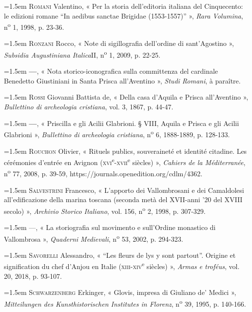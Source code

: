 \documentclass[12pt,twoside,openany]{book}
\newenvironment{PurhBibliography}
  {%
    \par
    \setlength{\parindent}{0pt}%
    \setlength{\leftskip}{0pt}%
  }
  {%
    \par
  }
\begin{document}
\begin{PurhBibliography}
\noindent\hangindent=1.5em \textsc{Romani} Valentino, « Per la storia dell’editoria italiana del Cinquecento: le edizioni romane “In aedibus sanctae Brigidae (1553-1557)” », \textit{Rara Volumina}, n\textsuperscript{o} 1, 1998, p. 23-36.\par
\noindent\hangindent=1.5em \textsc{Ronzani} Rocco, « Note di sigillografia dell’ordine di sant’Agostino », \textit{Subsidia Augustiniana Italica}\textsc{II}, n\textsuperscript{o} 1, 2009, p. 22-25.\par
\noindent\hangindent=1.5em \textbf{—}, « Nota storico-iconografica sulla committenza del cardinale Benedetto Giustiniani in Santa Prisca all’Aventino », \textit{Studi Romani}, à paraître.\par
\noindent\hangindent=1.5em \textsc{Rossi} Giovanni Battista de, « Della casa d’Aquila e Prisca all’Aventino », \textit{Bullettino di archeologia cristiana}, vol. 3, 1867, p. 44-47.\par
\noindent\hangindent=1.5em \textbf{—}, « Priscilla e gli Acilii Glabrioni. § \textsc{VIII}, Aquila e Prisca e gli Acilii Glabrioni », \textit{Bullettino di archeologia cristiana}, n\textsuperscript{o} 6, 1888-1889, p. 128-133.\par
\noindent\hangindent=1.5em \textsc{Rouchon} Olivier, « Rituels publics, souveraineté et identité citadine. Les cérémonies d’entrée en Avignon (\textsc{xvi}\textsuperscript{e}-\textsc{xvii}\textsuperscript{e} siècles) », \textit{Cahiers de la Méditerranée}, n\textsuperscript{o} 77, 2008, p. 39-59, https://journals.openedition.org/cdlm/4362.\par
\noindent\hangindent=1.5em \textsc{Salvestrini} Francesco, « L’apporto dei Vallombrosani e dei Camaldolesi all’edificazione della marina toscana (seconda metà del XVII-anni ’20 del XVIII secolo) », \textit{Archivio Storico Italiano}, vol. 156, n\textsuperscript{o} 2, 1998, p. 307-329.\par
\noindent\hangindent=1.5em —, « La storiografia sul movimento e sull’Ordine monastico di Vallombrosa », \textit{Quaderni Medievali}, n\textsuperscript{o} 53, 2002, p. 294-323.\par
\noindent\hangindent=1.5em \textsc{Savorelli} Alessandro, « “Les fleurs de lys y sont partout”. Origine et signification du chef d’Anjou en Italie (\textsc{xiii}-\textsc{xiv}\textsuperscript{e} siècles) », \textit{Armas e troféus}, vol. 20, 2018, p. 93-107.\par
\noindent\hangindent=1.5em \textsc{Schwarzenberg} Erkinger, « Glovis, impresa di Giuliano de’ Medici », \textit{Mitteilungen des Kunsthistorischen Institutes in Florenz}, n\textsuperscript{o} 39, 1995, p. 140-166.\par

\end{PurhBibliography}
\end{document}
